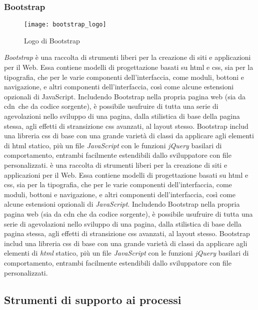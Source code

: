 \subsubsection{Bootstrap}
\begin{figure}[htb] 
    \centering 
    \texttt{[image: bootstrap\_logo]} 
    \caption{Logo di Bootstrap}
\end{figure}
\emph{Bootstrap} è una raccolta di strumenti liberi per la creazione di siti e applicazioni per il Web. Essa contiene modelli di progettazione basati su \gls{html} e \gls{css}, sia per la tipografia, che per le varie componenti dell'interfaccia, come moduli, bottoni e navigazione, e altri componenti dell'interfaccia, così come alcune estensioni opzionali di JavaScript.
Includendo Bootstrap nella propria pagina web (sia da \gls{cdn}\glsfirstoccur\  che da codice sorgente), è possibile usufruire di tutta una serie di agevolazioni nello sviluppo di una pagina, dalla stilistica di base della pagina stessa, agli effetti di stransizione \gls{css} avanzati, al layout stesso. 
Bootstrap includ una libreria \gls{css} di base con una grande varietà di classi da applicare agli elementi di \gls{html} statico, più un file \emph{JavaScript} con le funzioni \emph{jQuery} basilari di comportamento, entrambi facilmente estendibili dallo sviluppatore con file personalizzati. è una raccolta di strumenti liberi per la creazione di siti e applicazioni per il Web. Essa contiene modelli di progettazione basati su \gls{html} e \gls{css}, sia per la tipografia, che per le varie componenti dell'interfaccia, come moduli, bottoni e navigazione, e altri componenti dell'interfaccia, così come alcune estensioni opzionali di \emph{JavaScript}.
Includendo Bootstrap nella propria pagina web (sia da \gls{cdn} che da codice sorgente), è possibile usufruire di tutta una serie di agevolazioni nello sviluppo di una pagina, dalla stilistica di base della pagina stessa, agli effetti di stransizione \gls{css} avanzati, al layout stesso. 
Bootstrap includ una libreria \gls{css} di base con una grande varietà di classi da applicare agli elementi di \emph{html} statico, più un file \emph{JavaScript} con le funzioni \emph{jQuery} basilari di comportamento, entrambi facilmente estendibili dallo sviluppatore con file personalizzati.

\subsection{Strumenti di supporto ai processi}
